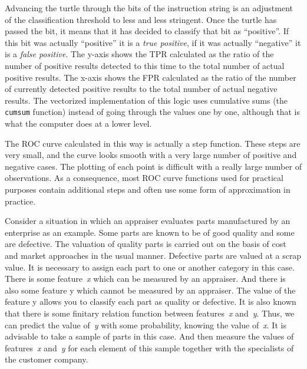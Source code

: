 \documentclass[]{scrreprt}
\begin{document}
Advancing the turtle through the bits of the instruction string is an adjustment of the classification threshold to less and less stringent. Once the turtle has passed the bit, it means that it has decided to classify that bit as ``positive''. If this bit was actually ``positive'' it is a \emph{true positive}, if it was actually ``negative'' it is a \emph{false positive}. The y-axis shows the TPR calculated as the ratio of the number of positive results detected to this time to the total number of actual positive results. The x-axis shows the FPR calculated as the ratio of the number of currently detected positive results to the total number of actual negative results. The vectorized implementation of this logic uses cumulative sums (the \texttt{cumsum} function) instead of going through the values one by one, although that is what the computer does at a lower level.

The ROC curve calculated in this way is actually a step function. These steps are very small, and the curve looks smooth with a very large number of positive and negative cases. The plotting of each point is difficult with a really large number of observations. As a consequence, most ROC curve functions used for practical purposes contain additional steps and often use some form of approximation in practice.

Consider a situation in which an appraiser evaluates parts manufactured by an enterprise as an example. Some parts are known to be of good quality and some are defective. The valuation of quality parts is carried out on the basis of cost and market approaches in the usual manner. Defective parts are valued at a scrap value. It is necessary to assign each part to one or another category in this case. There is some feature~\textit{x} which can be measured by an appraiser. And there is also some feature y which cannot be measured by an appraiser. The value of the feature y allows you to classify each part as quality or defective. It is also known that there is some finitary relation function between features~\textit{x} and~\textit{y}. Thus, we can predict the value of~\textit{y} with some probability, knowing the value of~\textit{x}. It is advisable to take a sample of parts in this case. And then measure the values of features~\textit{x} and~\textit{y} for each element of this sample together with the specialists of the customer company.
\end{document}
